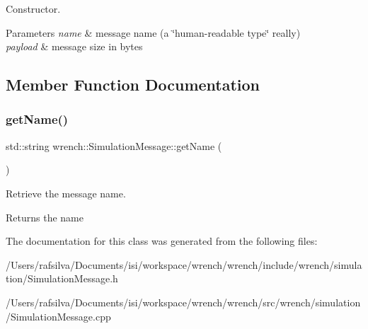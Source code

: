Constructor. 


\begin{DoxyParams}{Parameters}
{\em name} & message name (a \char`\"{}human-\/readable type\char`\"{} really) \\
\hline
{\em payload} & message size in bytes \\
\hline
\end{DoxyParams}


\subsection{Member Function Documentation}
\mbox{\label{classwrench_1_1_simulation_message_a22bcfd675a4f9de8bb2a833f097bb484}} 
\subsubsection{\texorpdfstring{get\+Name()}{getName()}}
{\footnotesize\ttfamily std\+::string wrench\+::\+Simulation\+Message\+::get\+Name (\begin{DoxyParamCaption}{ }\end{DoxyParamCaption})\hspace{0.3cm}{\ttfamily [virtual]}}



Retrieve the message name. 

\begin{DoxyReturn}{Returns}
the name 
\end{DoxyReturn}


The documentation for this class was generated from the following files\+:\begin{DoxyCompactItemize}
\item 
/\+Users/rafsilva/\+Documents/isi/workspace/wrench/wrench/include/wrench/simulation/Simulation\+Message.\+h\item 
/\+Users/rafsilva/\+Documents/isi/workspace/wrench/wrench/src/wrench/simulation/Simulation\+Message.\+cpp\end{DoxyCompactItemize}
